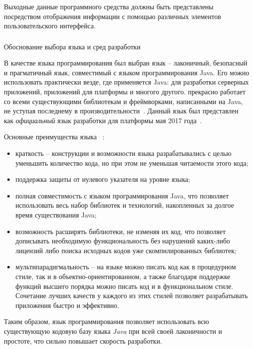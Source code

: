 Выходные данные программного средства должны быть представлены посредством отображения информации с помощью различных элементов пользовательского интерфейса.

\subsubsection{} Обоснование выбора языка и сред разработки
\label{sec:analysis:specification:lang_rationale}

В качестве языка программирования был выбран язык \emph{\kt} -- лаконичный, безопасный и прагматичный язык, совместимый с языком программирования Java.
Его можно использовать практически везде, где применяется Java: для разработки серверных приложений, приложений для платформы \andro и многого другого.
\kt прекрасно работает со всеми существующими библиотекам и фреймворками, написанными на Java, не уступая последнему в производительности~\cite{kotlin_in_action}.
Данный язык был представлен как \emph{официальный} язык разработки для платформы  мая 2017 года~\cite{kotlin_and_android}.

Основные преимущества языка \kt~\cite{kotlin_doc}:
\begin{itemize}
  \item краткость -- конструкции и возможности языка разрабатывались с целью уменьшить 
  количество кода, но при этом не уменьшая читаемости этого кода;
  \item поддержка защиты от нулевого указателя на уровне языка;
  \item полная совместимость с языком программирования Java, что позволяет использовать
  весь набор библиотек и технологий, накопленных за долгое время существования Java;
  \item возможность расширять библиотеки, не изменяя их код, что позволяет дописывать необходимую 
  функциональность без нарушений каких-либо лицензий либо поиска исходных кодов уже 
  скомпилированных библиотек;
  \item мультипарадигмальность -- на языке \kt можно писать код как в процедурном стиле, так и в
  объектно-ориентированном, а также благодаря поддержке функций высшего порядка можно 
  писать код и в функциональном стиле.
  Сочетание лучших качеств у каждого из этих стилей позволяет разрабатывать приложения быстро и эффективно.
\end{itemize}

Таким образом, язык программирования \kt позволяет использовать всю существующую кодовую базу языка \emph{Java} при всей своей лаконичности и простоте, что сильно повышает скорость разработки.

